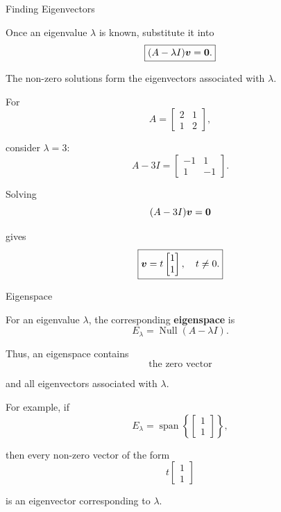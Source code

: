 
\begin{frame}{Finding Eigenvectors}

Once an eigenvalue $\lambda$ is known, substitute it into
\vspace{-0.1cm}
\[
\boxed{
(A-\lambda I)\bm{v}=\mathbf{0}.
}
\]

The non-zero solutions form the eigenvectors associated
with $\lambda$.

For
\vspace{-0.1cm}
\[
A=
\begin{bmatrix}
2&1\\
1&2
\end{bmatrix},
\]

consider $\lambda=3$:
\vspace{-0.1cm}
\[
A-3I
=
\begin{bmatrix}
-1&1\\
1&-1
\end{bmatrix}.
\]

Solving
\vspace{-0.2cm}
\[
(A-3I)\bm{v}=\mathbf{0}
\]

gives
\vspace{-0.2cm}
\[
\boxed{
\bm{v}
=
t
\begin{bmatrix}
1\\1
\end{bmatrix},
\quad t\neq0.
}
\]

\end{frame}



\begin{frame}{Eigenspace}

For an eigenvalue $\lambda$, the corresponding
\textbf{eigenspace} is
\vspace{-0.1cm}
\[
\boxed{
E_{\lambda}
=
\operatorname{Null}(A-\lambda I).
}
\]

Thus, an eigenspace contains
\vspace{-0.1cm}
\[
\text{the zero vector}
\]

and all eigenvectors associated with $\lambda$.

For example, if
\vspace{-0.1cm}
\[
E_{\lambda}
=
\operatorname{span}
\left\{
\begin{bmatrix}
1\\1
\end{bmatrix}
\right\},
\]

then every non-zero vector of the form
\vspace{-0.1cm}
\[
t
\begin{bmatrix}
1\\1
\end{bmatrix}
\]

is an eigenvector corresponding to $\lambda$.

\end{frame}


